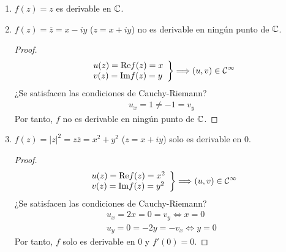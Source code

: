 \begin{ejemplo}
    \begin{enumerate}
        \item $f(z) = z$ es derivable en $\mathbb{C}$.
        \item $f(z) = \overline{z} = x -iy$ ($z = x+iy$) no es derivable en ningún punto de $\mathbb{C}$.
              \begin{proof}
                  \begin{align*}
                      \left. \begin{array}{lcc}
                                 u(z) = \text{Re} f(z) = x \\
                                 v(z) = \text{Im} f(z) = y \\
                             \end{array}
                      \right\} \Longrightarrow (u,v) \in \mathcal{C}^{\infty}
                  \end{align*}
                  ¿Se satisfacen las condiciones de Cauchy-Riemann?
                  \begin{align*}
                      u_x = 1 \not = -1 = v_y
                  \end{align*}
                  Por tanto, $f$ no es derivable en ningún punto de $\mathbb{C}$.
              \end{proof}
        \item $f(z) = |z|^2 = z \overline{z} = x^2 + y^2$ ($z = x + iy$) solo es derivable en $0$.
              \begin{proof}
                  \begin{align*}
                      \left. \begin{array}{lcc}
                                 u(z) = \text{Re} f(z) = x^2 \\
                                 v(z) = \text{Im} f(z) = y^2 \\
                             \end{array}
                      \right\} \Longrightarrow (u,v) \in \mathcal{C}^{\infty}
                  \end{align*}
                  ¿Se satisfacen las condiciones de Cauchy-Riemann?
                  \begin{align*}
                      u_x = 2x = 0 = v_y \Longleftrightarrow x = 0 \\
                      u_y = 0 = -2y = -v_x \Longleftrightarrow y = 0
                  \end{align*}
                  Por tanto, $f$ solo es derivable en $0$ y $f'(0) = 0$.

\end{proof}
\end{enumerate}
\end{ejemplo}

